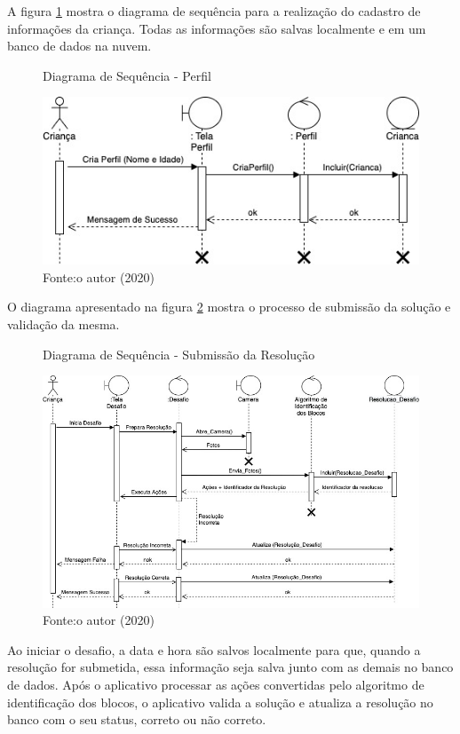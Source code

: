         
        A figura \ref{figura:sequencia_perfil} mostra o diagrama de sequência para a realização do cadastro de informações da criança. Todas as informações são salvas localmente e em um banco de dados na nuvem.
        
        \begin{figure}[h!]
            \centering
            \caption{Diagrama de Sequência - Perfil}
            \includegraphics[width=12cm]{images/cap3/Sequencia_Perfil.jpg}
            \caption*{Fonte:o autor (2020)}
            \label{figura:sequencia_perfil}
        \end{figure}
        
        
        O diagrama apresentado na figura \ref{figura:sequencia_jogo} mostra o processo de submissão da solução e validação da mesma.
        
        \begin{figure}[h!]
            \centering
            \caption{Diagrama de Sequência - Submissão da Resolução}
            \includegraphics[width=16cm]{images/cap3/Sequencia_Jogo.jpg}
            \caption*{Fonte:o autor (2020)}
            \label{figura:sequencia_jogo}
        \end{figure}
        
        Ao iniciar o desafio, a data e hora são salvos localmente para que, quando a resolução for submetida, essa informação seja salva junto com as demais no banco de dados.
        Após o aplicativo processar as ações convertidas pelo algoritmo de identificação dos blocos, o aplicativo valida a solução e atualiza a resolução no banco com o seu status, correto ou não correto.
        
        
   